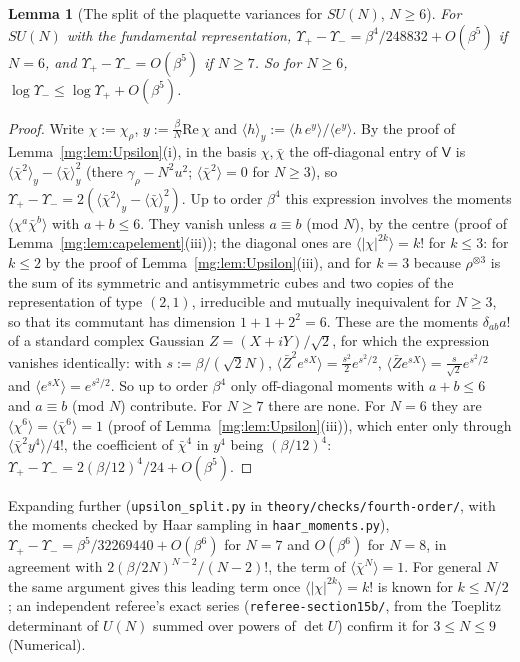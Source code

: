 \documentclass[11pt,a4paper]{article}
\newtheorem{lemma}[theorem]{Lemma}
\theoremstyle{definition}
\theoremstyle{remark}
\begin{document}
\begin{lemma}[The split of the plaquette variances for $SU(N)$, $N\ge6$]\label{mg:lem:split}
For $SU(N)$ with the fundamental representation, $\Upsilon_+-\Upsilon_-=\beta^4/248832+O(\beta^5)$ if $N=6$, and $\Upsilon_+-\Upsilon_-=O(\beta^5)$ if $N\ge7$. So for
$N\ge6$, $\log\Upsilon_-\le\log\Upsilon_++O(\beta^5)$.
\end{lemma}

\begin{proof}
Write $\chi:=\chi_\rho$, $y:=\frac\beta N\mathrm{Re}\,\chi$ and $\langle h\rangle_y:=\langle h\,e^y\rangle/\langle e^y\rangle$. By the proof of Lemma~\ref{mg:lem:Upsilon}(i), in the basis $\chi,\bar\chi$ the
off-diagonal entry of $\mathsf V$ is $\langle\bar\chi^2\rangle_y-\langle\bar\chi\rangle_y^2$ (there $\gamma_\rho-N^2u^2$; $\langle\bar\chi^2\rangle=0$ for $N\ge3$), so
$\Upsilon_+-\Upsilon_-=2(\langle\bar\chi^2\rangle_y-\langle\bar\chi\rangle_y^2)$. Up to order $\beta^4$ this expression involves the moments $\langle\chi^a\bar\chi^b\rangle$ with $a+b\le6$. They vanish
unless $a\equiv b$ (mod $N$), by the centre (proof of Lemma~\ref{mg:lem:capelement}(iii)); the diagonal ones are $\langle|\chi|^{2k}\rangle=k!$ for $k\le3$: for $k\le2$ by the
proof of Lemma~\ref{mg:lem:Upsilon}(iii), and for $k=3$ because $\rho^{\otimes3}$ is the sum of its symmetric and antisymmetric cubes and two copies of the representation of
type $(2,1)$, irreducible and mutually inequivalent for $N\ge3$, so that its commutant has dimension $1+1+2^2=6$. These are the moments $\delta_{ab}a!$ of a standard
complex Gaussian $Z=(X+iY)/\sqrt2$, for which the expression vanishes identically: with $s:=\beta/(\sqrt2N)$,
$\langle\bar Z^2e^{sX}\rangle=\frac{s^2}2e^{s^2/2}$, $\langle\bar Ze^{sX}\rangle=\frac s{\sqrt2}e^{s^2/2}$ and $\langle e^{sX}\rangle=e^{s^2/2}$. So up to order $\beta^4$ only off-diagonal moments with
$a+b\le6$ and $a\equiv b$ (mod $N$) contribute. For $N\ge7$ there are none. For $N=6$ they are $\langle\chi^6\rangle=\langle\bar\chi^6\rangle=1$ (proof of
Lemma~\ref{mg:lem:Upsilon}(iii)), which enter only through $\langle\bar\chi^2y^4\rangle/4!$, the coefficient of $\bar\chi^4$ in $y^4$ being $(\beta/12)^4$:
$\Upsilon_+-\Upsilon_-=2(\beta/12)^4/24+O(\beta^5)$.
\end{proof}

Expanding further (\texttt{upsilon\_split.py} in \texttt{theory/checks/fourth-order/}, with the moments checked by Haar sampling in \texttt{haar\_moments.py}), $\Upsilon_+-\Upsilon_-=\beta^5/32269440+O(\beta^6)$ for
$N=7$ and $O(\beta^6)$ for $N=8$, in agreement with $2(\beta/2N)^{N-2}/(N-2)!$, the term of $\langle\bar\chi^N\rangle=1$. For general $N$ the same argument gives this leading term once
$\langle|\chi|^{2k}\rangle=k!$ is known for $k\le N/2$; an independent referee's exact series (\texttt{referee-section15b/}, from the Toeplitz determinant of $U(N)$
summed over powers of $\det U$) confirm it for $3\le N\le9$ (Numerical).
\end{document}
